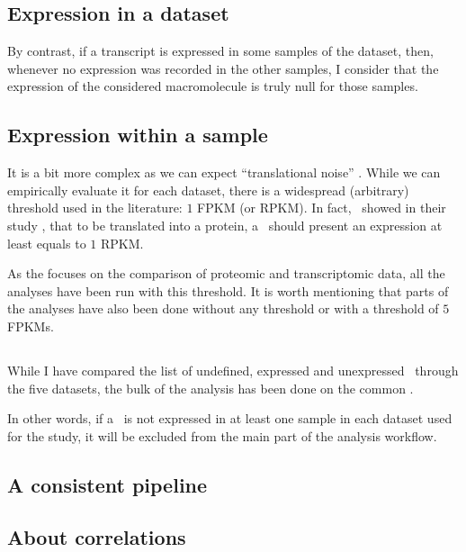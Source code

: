 \subsection{Expression in a dataset}
\label{subsec:IntegrationExpressedOrNot--expDataset}
By contrast, if a transcript is expressed in some samples of the dataset,
then, whenever no expression was recorded in the other
samples, I consider that the expression of the considered macromolecule is truly
null for those samples.

\subsection{Expression within a sample}\label{subsubsec:exprTrans}
It is a bit more complex as we can expect ``translational noise'' \TKR{}.
While we can empirically evaluate it for each dataset,
there is a widespread (arbitrary) threshold used in the literature:
$1$ \gls{FPKM} (or \gls{RPKM}). In fact,~\citet{Hebenstreit:2011} showed in
their study ,
that to be translated into a protein, a \mRNA\ should
present an expression at least equals to $1$ \gls{RPKM}.

As the  focuses on the comparison of proteomic and
transcriptomic data, all the analyses have been run with this threshold.
It is worth mentioning that parts of the analyses have also been done without
any threshold or with a threshold of $5$ \glspl{FPKM}.

\subsection*{}

While I have compared the list of undefined, expressed and unexpressed \mRNAs\
through the five datasets,
the bulk of the analysis has been done on the common \mRNAs.

In other words, if a \mRNA\ is not expressed in at least one sample in each
dataset used for the study, it will be excluded from the main part of the
analysis workflow.



\subsection{A consistent pipeline}

\subsection{About correlations}

